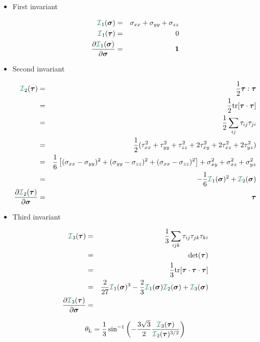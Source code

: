 \begin{itemize}
\item First invariant %

\begin{eqnarray}
{\III}_1(\bm\sigma) &=& \sigma_{xx}+\sigma_{yy}+\sigma_{zz} \nn\\
{\III}_1(\bm\tau) &=& 0 \nn\\ 
\frac{\partial {\III}_1(\bm\sigma)}{\partial \bm\sigma} &=& {\bm 1}  \nn
\end{eqnarray}


\item Second invariant %


\begin{eqnarray}
{\III}_2(\bm\tau) 
&=& \frac12 {\bm \tau}:{\bm \tau} \nn\\
&=& \frac12 {\rm tr} [{\bm \tau}\cdot {\bm \tau}] \nn\\
&=& \frac12 \sum_{ij} \tau_{ij}\tau_{ji}  \nn\\
&=& \frac12 ( \tau_{xx}^2 + \tau_{yy}^2 +\tau_{zz}^2 + 2\tau_{xy}^2+ 2\tau_{xz}^2+ 2\tau_{yz}^2) \nn\\
&=& \frac{1}{6}\left[(\sigma_{xx}-\sigma_{yy})^2 + (\sigma_{yy}-\sigma_{zz})^2 
+ (\sigma_{xx}-\sigma_{zz})^2 \right]  + \sigma_{xy}^2 + \sigma_{xz}^2 + \sigma_{yz}^2 \nn\\
&=&  -\frac16 {\III}_1(\bm\sigma)^2 + {\III}_2(\bm\sigma) \nn\\
\frac{\partial {\III}_2(\bm\tau)}{\partial \bm\sigma} &=& \bm\tau   \nn
\end{eqnarray}

\item Third invariant %

\begin{eqnarray}
{\III}_3(\bm\tau) 
&=& \frac13 \sum_{ijk} \tau_{ij}\tau_{jk}\tau_{ki} \nn\\
&=& {\rm det}(\bm\tau) \nn\\
&=& \frac13 {\rm tr} [{\bm \tau}\cdot {\bm \tau} \cdot {\bm \tau}] \nn\\
&=& \frac{2}{27}  {\III}_1(\bm\sigma)^3 - \frac23{\III}_1(\bm\sigma) {\III}_2(\bm\sigma)
+{\III}_3(\bm\sigma) \nn\\
\frac{\partial {\III}_3(\bm\tau)}{\partial \bm\sigma} &=&
\end{eqnarray}

\begin{equation}
\theta_{\rm L}=\frac{1}{3} \sin^{-1} 
\left( -\frac{3\sqrt{3}}{2} \frac{{\III}_3({\bm \tau})}{{\III}_2({\bm \tau})^{3/2}} \right)
\end{equation}


\end{itemize}


